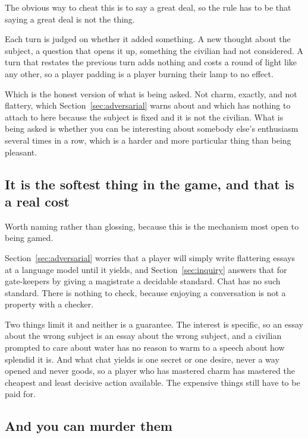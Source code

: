 \documentclass[11pt,a4paper]{article}
\begin{document}
The obvious way to cheat this is to say a great deal, so the rule has to be that saying a great
deal is not the thing.

Each turn is judged on whether it added something. A new thought about the subject, a question that
opens it up, something the civilian had not considered. A turn that restates the previous turn adds
nothing and costs a round of light like any other, so a player padding is a player burning their
lamp to no effect.

\begin{sectionbox}
Which is the honest version of what is being asked. Not charm, exactly, and not flattery, which
Section~\ref{sec:adversarial} warns about and which has nothing to attach to here because the
subject is fixed and it is not the civilian. What is being asked is whether you can be interesting
about somebody else's enthusiasm several times in a row, which is a harder and more particular
thing than being pleasant.
\end{sectionbox}

\subsection{It is the softest thing in the game, and that is a real cost}

Worth naming rather than glossing, because this is the mechanism most open to being gamed.

Section~\ref{sec:adversarial} worries that a player will simply write flattering essays at a
language model until it yields, and Section~\ref{sec:inquiry} answers that for gate-keepers by giving a
magistrate a decidable standard. Chat has no such standard. There is nothing to check, because
enjoying a conversation is not a property with a checker.

\begin{alarmbox}
Two things limit it and neither is a guarantee. The interest is specific, so an essay about the
wrong subject is an essay about the wrong subject, and a civilian prompted to care about water has
no reason to warm to a speech about how splendid it is. And what chat yields is one secret or one
desire, never a way opened and never goods, so a player who has mastered charm has mastered the
cheapest and least decisive action available. The expensive things still have to be paid for.
\end{alarmbox}

\subsection{And you can murder them}
\label{sec:murder}
\end{document}
